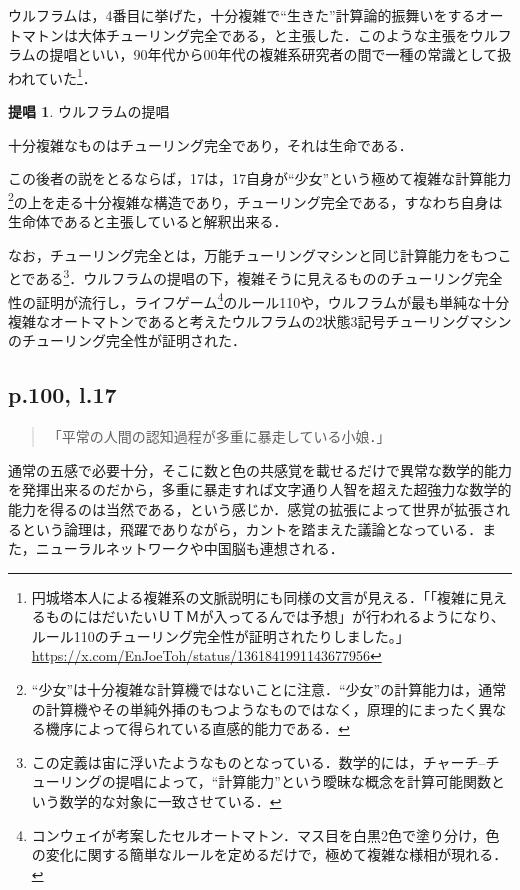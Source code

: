 \documentclass[10pt, a5paper, twoside]{jsarticle}
\theoremstyle{definition}
\newtheorem{ths}{提唱}
\begin{document}
			ウルフラムは，4番目に挙げた，十分複雑で“生きた”計算論的振舞いをするオートマトンは大体チューリング完全である，と主張した．このような主張をウルフラムの提唱といい，90年代から00年代の複雑系研究者の間で一種の常識として扱われていた\footnote{円城塔本人による複雑系の文脈説明にも同様の文言が見える．「「複雑に見えるものにはだいたいＵＴＭが入ってるんでは予想」が行われるようになり、ルール110のチューリング完全性が証明されたりしました。」\url{https://x.com/EnJoeToh/status/1361841991143677956}}．

			\begin{ths}

				ウルフラムの提唱

				十分複雑なものはチューリング完全であり，それは生命である．
				
			\end{ths}

			この後者の説をとるならば，17は，17自身が“少女”という極めて複雑な計算能力\footnote{“少女”は十分複雑な計算機ではないことに注意．“少女”の計算能力は，通常の計算機やその単純外挿のもつようなものではなく，原理的にまったく異なる機序によって得られている直感的能力である．}の上を走る十分複雑な構造であり，チューリング完全である，すなわち自身は生命体であると主張していると解釈出来る．

			なお，チューリング完全とは，万能チューリングマシンと同じ計算能力をもつことである\footnote{この定義は宙に浮いたようなものとなっている．数学的には，チャーチ--チューリングの提唱によって，“計算能力”という曖昧な概念を計算可能関数という数学的な対象に一致させている．}．ウルフラムの提唱の下，複雑そうに見えるもののチューリング完全性の証明が流行し，ライフゲーム\footnote{コンウェイが考案したセルオートマトン．マス目を白黒2色で塗り分け，色の変化に関する簡単なルールを定めるだけで，極めて複雑な様相が現れる．}のルール110や，ウルフラムが最も単純な十分複雑なオートマトンであると考えたウルフラムの2状態3記号チューリングマシンのチューリング完全性が証明された\cite{mth,smth}．

		\subsection{p.100, l.17}

			\begin{quote}

				「平常の人間の認知過程が多重に暴走している小娘．」
				
			\end{quote}

			通常の五感で必要十分，そこに数と色の共感覚を載せるだけで異常な数学的能力を発揮出来るのだから，多重に暴走すれば文字通り人智を超えた超強力な数学的能力を得るのは当然である，という感じか．感覚の拡張によって世界が拡張されるという論理は，飛躍でありながら，カントを踏まえた議論となっている．また，ニューラルネットワークや中国脳も連想される．
\end{document}
